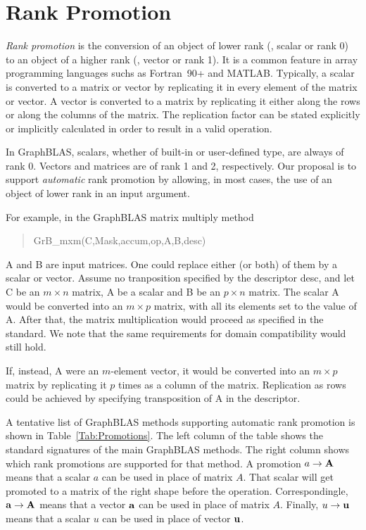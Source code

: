 \section{Rank Promotion}
\label{Sec:promotion}

\renewcommand{\vector}[1]{{\bf #1}}
\renewcommand{\matrix}[1]{{\bf #1}}

\emph{Rank promotion} is the conversion of an object of lower rank (\eg,
scalar or rank 0) to an object of a higher rank (\eg, vector or rank 1).
It is a common feature in array programming languages suchs as Fortran~90+
and MATLAB.  Typically, a scalar is converted to a matrix or vector
by replicating it in every element of the matrix or vector. A vector is
converted to a matrix by replicating it either along the rows or along the
columns of the matrix.  The replication factor can be stated explicitly
or implicitly calculated in order to result in a valid operation.

In GraphBLAS, scalars, whether of built-in or user-defined type, are
always of rank 0. Vectors and matrices are of rank 1 and 2, respectively.
Our proposal is to support \emph{automatic} rank promotion by allowing,
in most cases, the use of an object of lower rank in an input argument.

For example, in the GraphBLAS matrix multiply method 
\begin{quote} 
{\sf GrB\_mxm(C,Mask,accum,op,A,B,desc)}
\end{quote}
{\sf A} and {\sf B} are input matrices. One could replace either (or both)
of them by a scalar or vector.  Assume no tranposition specified by the
descriptor {\sf desc}, and let {\sf C} be an $m \times n$ matrix, {\sf A}
be a scalar and {\sf B} be an $p \times n$ matrix. The scalar {\sf A}
would be converted into an $m \times p$ matrix, with all its elements
set to the value of {\sf A}.  After that, the matrix multiplication would
proceed as specified in the standard.  We note that the same requirements
for domain compatibility would still hold.

If, instead, {\sf A} were an $m$-element vector, it would be converted
into an $m \times p$ matrix by replicating it $p$ times as a column
of the matrix.  Replication as rows could be achieved by specifying
transposition of {\sf A} in the descriptor.

A tentative list of GraphBLAS methods supporting automatic rank promotion
is shown in Table~\ref{Tab:Promotions}.  The left column of the table
shows the standard signatures of the main GraphBLAS methods. The right
column shows which rank promotions are supported for that method. A
promotion $a \rightarrow \matrix{A}$ means that a scalar $a$ can be
used in place of matrix $A$. That scalar will get promoted to a matrix
of the right shape before the operation.  Correspondingle, $\vector{a}
\rightarrow \matrix{A}$ means that a vector $\vector{a}$ can be used in
place of matrix $A$. Finally, $u \rightarrow \vector{u}$ means that a
scalar $u$ can be used in place of vector $\vector{u}$.


